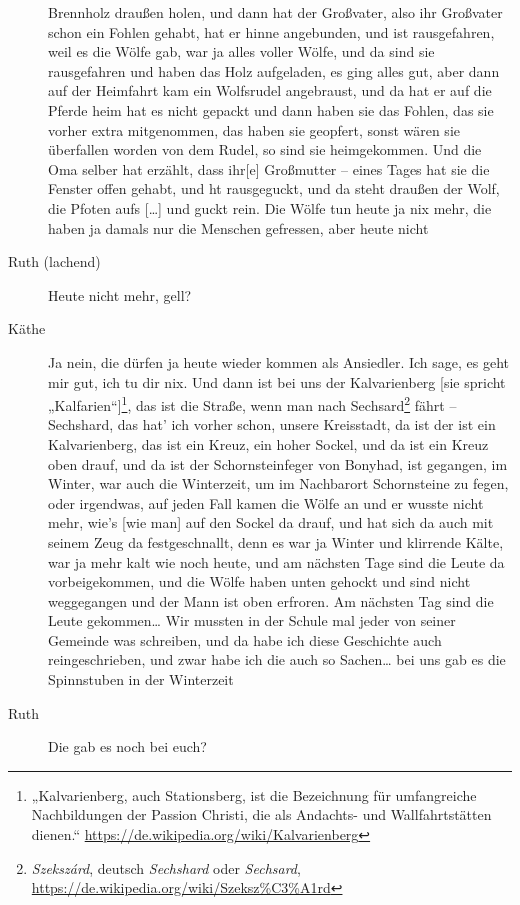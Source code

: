 \documentclass[ngerman,]{article}
\begin{document}
\begin{multicols}{2}
\begin{description}
Brennholz draußen holen, und dann hat der Großvater, also ihr Großvater
schon ein Fohlen gehabt, hat er hinne angebunden, und ist rausgefahren,
weil es die Wölfe gab, war ja alles voller Wölfe, und da sind sie
rausgefahren und haben das Holz aufgeladen, es ging alles gut, aber dann
auf der Heimfahrt kam ein Wolfsrudel angebraust, und da hat er auf die
Pferde heim hat es nicht gepackt und dann haben sie das Fohlen, das sie
vorher extra mitgenommen, das haben sie geopfert, sonst wären sie
überfallen worden von dem Rudel, so sind sie heimgekommen. Und die Oma
selber hat erzählt, dass ihr{[}e{]} Großmutter – eines Tages hat sie die
Fenster offen gehabt, und ht rausgeguckt, und da steht draußen der Wolf,
die Pfoten aufs {[}\ldots{}{]} und guckt rein. Die Wölfe tun heute ja
nix mehr, die haben ja damals nur die Menschen gefressen, aber heute
nicht
\item[Ruth (lachend)]
Heute nicht mehr, gell?
\item[Käthe]
Ja nein, die dürfen ja heute wieder kommen als Ansiedler. Ich sage, es
geht mir gut, ich tu dir nix. Und dann ist bei uns der Kalvarienberg
{[}sie spricht „Kalfarien“{]}\footnote{„Kalvarienberg, auch
  Stationsberg, ist die Bezeichnung für umfangreiche Nachbildungen der
  Passion Christi, die als Andachts- und Wallfahrtstätten dienen.“
  \url{https://de.wikipedia.org/wiki/Kalvarienberg}}, das ist die
Straße, wenn man nach Sechsard\footnote{\emph{Szekszárd}, deutsch
  \emph{Sechshard} oder \emph{Sechsard},
  \url{https://de.wikipedia.org/wiki/Szeksz\%C3\%A1rd}} fährt –
Sechshard, das hat' ich vorher schon, unsere Kreisstadt, da ist der ist
ein Kalvarienberg, das ist ein Kreuz, ein hoher Sockel, und da ist ein
Kreuz oben drauf, und da ist der Schornsteinfeger von Bonyhad, ist
gegangen, im Winter, war auch die Winterzeit, um im Nachbarort
Schornsteine zu fegen, oder irgendwas, auf jeden Fall kamen die Wölfe an
und er wusste nicht mehr, wie's {[}wie man{]} auf den Sockel da drauf,
und hat sich da auch mit seinem Zeug da festgeschnallt, denn es war ja
Winter und klirrende Kälte, war ja mehr kalt wie noch heute, und am
nächsten Tage sind die Leute da vorbeigekommen, und die Wölfe haben
unten gehockt und sind nicht weggegangen und der Mann ist oben erfroren.
Am nächsten Tag sind die Leute gekommen\ldots{} Wir mussten in der
Schule mal jeder von seiner Gemeinde was schreiben, und da habe ich
diese Geschichte auch reingeschrieben, und zwar habe ich die auch so
Sachen\ldots{} bei uns gab es die Spinnstuben in der Winterzeit
\item[Ruth]
Die gab es noch bei euch?

\end{description}
\end{multicols}
\end{document}
